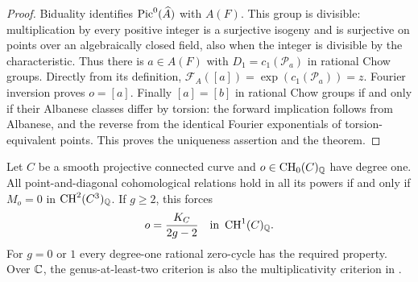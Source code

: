 \begin{proof}
Biduality identifies $\operatorname{Pic}^0(\widehat A)$ with $A(F)$. This group is divisible: multiplication by every positive integer is a surjective isogeny and is surjective on points over an algebraically closed field, also when the integer is divisible by the characteristic. Thus there is $a\in A(F)$ with $D_1=c_1(\mathcal P_a)$ in rational Chow groups. Directly from its definition, $\mathcal F_A([a])=\exp(c_1(\mathcal P_a))=z$. Fourier inversion proves $o=[a]$. Finally $[a]=[b]$ in rational Chow groups if and only if their Albanese classes differ by torsion: the forward implication follows from Albanese, and the reverse from the identical Fourier exponentials of torsion-equivalent points. This proves the uniqueness assertion and the theorem.
\end{proof}

\begin{proposition}
\label{c:curve-chow-criterion}
Let $C$ be a smooth projective connected curve and $o\in\operatorname{CH}_0(C)_\mathbb Q$ have degree one. All point-and-diagonal cohomological relations hold in all its powers if and only if $M_o=0$ in $\operatorname{CH}^2(C^3)_\mathbb Q$. If $g\geq2$, this forces
\[
 o=\frac{K_C}{2g-2}\quad\text{in }\operatorname{CH}^1(C)_\mathbb Q.
\]
For $g=0$ or $1$ every degree-one rational zero-cycle has the required property. Over $\mathbb C$, the genus-at-least-two criterion is also the multiplicativity criterion in \citet[Propositions 3.1 and 3.5]{c_fulaterveervial2021}.
\end{proposition}

